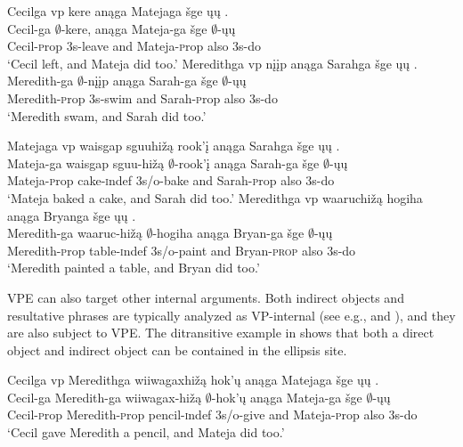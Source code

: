 \documentclass[output=paper]{LSP/langsci}
\begin{document}
\ea\label{ex:johnson:3}
\ea\label{ex:johnson:3a} 
\glll Cecilga {\ob}{vp} kere{\cb} anąga Matejaga šge {\ob}ųų{\cb} .\\
Cecil-ga {} $\emptyset$-kere, anąga Mateja-ga šge $\emptyset$-ųų\\
Cecil-{\textsc prop} {} {\textsc 3s}-leave and Mateja-{\textsc prop} also {\textsc 3s}-do\\
\trans `Cecil left, and Mateja did too.' 
\ex\label{ex:johnson:3b} 
\glll Meredithga {\ob}{vp} nįįp{\cb} anąga Sarahga šge {\ob}ųų{\cb} .\\
Meredith-ga {} $\emptyset$-nįįp anąga Sarah-ga šge $\emptyset$-ųų\\
Meredith-{\textsc prop} {} {\textsc 3s}-swim and Sarah-{\textsc prop} also {\textsc 3s}-do\\
\trans `Meredith swam, and Sarah did too.'
\z
\z
 
\ea\label{ex:johnson:4}
\ea\label{ex:johnson:4a} 
\glll Matejaga {\ob}{vp} {waisgap sguuhižą} rook'į{\cb} anąga Sarahga šge {\ob}ųų{\cb} .\\
Mateja-ga {} {waisgap sguu-hižą} $\emptyset$-rook'į anąga Sarah-ga šge $\emptyset$-ųų\\
Mateja-{\textsc prop} {} cake-{\textsc indef} {\textsc 3s/o}-bake and Sarah-{\textsc prop} also {\textsc 3s}-do\\
\trans `Mateja baked a cake, and Sarah did too.' 
\ex\label{ex:johnson:4b} 
\glll Meredithga {\ob}{vp} waaruchižą hogiha{\cb} anąga Bryanga šge {\ob}ųų{\cb} .\\
Meredith-ga {} waaruc-hižą $\emptyset$-hogiha anąga Bryan-ga šge $\emptyset$-ųų\\
Meredith-{\textsc prop} {} table-{\textsc indef} {\textsc 3s/o}-paint and Bryan-\textsc{prop} also {\textsc 3s}-do\\
\trans `Meredith painted a table, and Bryan did too.'
\z
\z

VPE can also target other internal arguments. Both indirect objects and resultative phrases are typically analyzed as VP-internal (see e.g., \citealt{Larson1988} and \citealt{LevinRappaportHovav1995}), and they are also subject to VPE. The ditransitive example in  shows that both a direct object and indirect object can be contained in the ellipsis site.

 
\ea\label{ex:johnson:5} 
\glll Cecilga {\ob}{vp} Meredithga wiiwagaxhižą hok'ų{\cb} anąga Matejaga šge {\ob}ųų{\cb} .\\
Cecil-ga {} Meredith-ga wiiwagax-hižą $\emptyset$-hok'ų anąga Mateja-ga šge $\emptyset$-ųų\\
Cecil-{\textsc prop} {} Meredith-{\textsc prop} pencil-{\textsc indef} {\textsc 3s/o}-give and Mateja-{\textsc prop} also {\textsc 3s}-do\\
\trans `Cecil gave Meredith a pencil, and Mateja did too.'
\z
\end{document}
